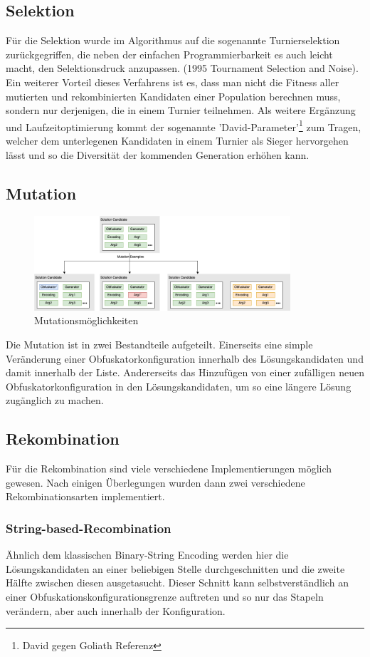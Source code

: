 \subsection{Selektion}
Für die Selektion wurde im Algorithmus auf die sogenannte Turnierselektion zurückgegriffen, die neben der einfachen Programmierbarkeit es auch leicht macht, den Selektionsdruck anzupassen. \cite{blickle_1996_a} (1995 Tournament Selection and Noise). Ein weiterer Vorteil dieses Verfahrens ist es, dass man nicht die Fitness aller mutierten und rekombinierten Kandidaten einer Population berechnen muss, sondern nur derjenigen, die in einem Turnier teilnehmen. Als weitere Ergänzung und Laufzeitoptimierung kommt der sogenannte 'David-Parameter'\footnote{David gegen Goliath Referenz} zum Tragen, welcher dem unterlegenen Kandidaten in einem Turnier als Sieger hervorgehen lässt und so die Diversität der kommenden Generation erhöhen kann.

\subsection{Mutation}
\begin{figure}[h]
    \centering
    \includegraphics[width=0.85\textwidth]{gfx/Abbildungen/Mutations.png}
    \caption{Mutationsmöglichkeiten}
    \label{fig:mutations}
\end{figure}
Die Mutation ist in zwei Bestandteile aufgeteilt. Einerseits eine simple Veränderung einer Obfuskatorkonfiguration innerhalb des Lösungskandidaten und damit innerhalb der Liste. Andererseits das Hinzufügen von einer zufälligen neuen Obfuskatorkonfiguration in den Lösungskandidaten, um so eine längere Lösung zugänglich zu machen.


\subsection{Rekombination}
Für die Rekombination sind viele verschiedene Implementierungen möglich gewesen. Nach einigen Überlegungen wurden dann zwei verschiedene Rekombinationsarten implementiert.
\subsubsection{String-based-Recombination}
Ähnlich dem klassischen Binary-String Encoding werden hier die Lösungskandidaten an einer beliebigen Stelle durchgeschnitten und die zweite Hälfte zwischen diesen ausgetasucht. Dieser Schnitt kann selbstverständlich an einer Obfuskationskonfigurationsgrenze auftreten und so nur das Stapeln verändern, aber auch innerhalb der Konfiguration.
